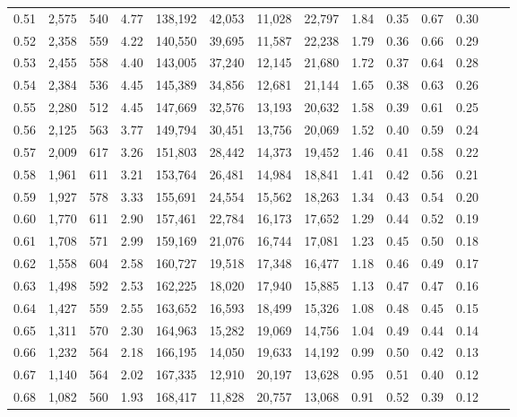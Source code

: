 \begin{tabular}{rrrrrrrrrrrrrr}
0.51 &  2,575 &  540 &    4.77 &  138,192 &   42,053 &  11,028 &  22,797 &  1.84 &  0.35 &  0.67 &      0.30 \\
0.52 &  2,358 &  559 &    4.22 &  140,550 &   39,695 &  11,587 &  22,238 &  1.79 &  0.36 &  0.66 &      0.29 \\
0.53 &  2,455 &  558 &    4.40 &  143,005 &   37,240 &  12,145 &  21,680 &  1.72 &  0.37 &  0.64 &      0.28 \\
0.54 &  2,384 &  536 &    4.45 &  145,389 &   34,856 &  12,681 &  21,144 &  1.65 &  0.38 &  0.63 &      0.26 \\
0.55 &  2,280 &  512 &    4.45 &  147,669 &   32,576 &  13,193 &  20,632 &  1.58 &  0.39 &  0.61 &      0.25 \\
0.56 &  2,125 &  563 &    3.77 &  149,794 &   30,451 &  13,756 &  20,069 &  1.52 &  0.40 &  0.59 &      0.24 \\
0.57 &  2,009 &  617 &    3.26 &  151,803 &   28,442 &  14,373 &  19,452 &  1.46 &  0.41 &  0.58 &      0.22 \\
0.58 &  1,961 &  611 &    3.21 &  153,764 &   26,481 &  14,984 &  18,841 &  1.41 &  0.42 &  0.56 &      0.21 \\
0.59 &  1,927 &  578 &    3.33 &  155,691 &   24,554 &  15,562 &  18,263 &  1.34 &  0.43 &  0.54 &      0.20 \\
0.60 &  1,770 &  611 &    2.90 &  157,461 &   22,784 &  16,173 &  17,652 &  1.29 &  0.44 &  0.52 &      0.19 \\
0.61 &  1,708 &  571 &    2.99 &  159,169 &   21,076 &  16,744 &  17,081 &  1.23 &  0.45 &  0.50 &      0.18 \\
0.62 &  1,558 &  604 &    2.58 &  160,727 &   19,518 &  17,348 &  16,477 &  1.18 &  0.46 &  0.49 &      0.17 \\
0.63 &  1,498 &  592 &    2.53 &  162,225 &   18,020 &  17,940 &  15,885 &  1.13 &  0.47 &  0.47 &      0.16 \\
0.64 &  1,427 &  559 &    2.55 &  163,652 &   16,593 &  18,499 &  15,326 &  1.08 &  0.48 &  0.45 &      0.15 \\
0.65 &  1,311 &  570 &    2.30 &  164,963 &   15,282 &  19,069 &  14,756 &  1.04 &  0.49 &  0.44 &      0.14 \\
0.66 &  1,232 &  564 &    2.18 &  166,195 &   14,050 &  19,633 &  14,192 &  0.99 &  0.50 &  0.42 &      0.13 \\
0.67 &  1,140 &  564 &    2.02 &  167,335 &   12,910 &  20,197 &  13,628 &  0.95 &  0.51 &  0.40 &      0.12 \\
0.68 &  1,082 &  560 &    1.93 &  168,417 &   11,828 &  20,757 &  13,068 &  0.91 &  0.52 &  0.39 &      0.12 \\

\end{tabular}
